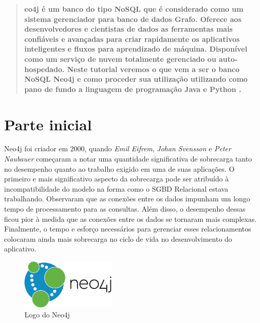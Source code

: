 \documentclass[a4paper,11pt]{article}
\begin{document}
	
\maketitle %
\thispagestyle{fancy} %

	
\begin{abstract}
	\textbf{eo4j é um banco do tipo NoSQL que é considerado como um sistema gerenciador para banco de dados Grafo. Oferece aos desenvolvedores e cientistas de dados as ferramentas mais confiáveis e avançadas para criar rapidamente os aplicativos inteligentes e fluxos para aprendizado de máquina. Disponível como um serviço de nuvem totalmente gerenciado ou auto-hospedado. Neste tutorial veremos o que vem a ser o banco NoSQL Neo4j \cite{neo4joficial} e como proceder sua utilização utilizando como pano de fundo a linguagem de programação Java \cite{javaoficial} e Python \cite{pythonoficial}.}
\end{abstract}


\section{Parte inicial}
Neo4j foi criador em 2000, quando \textit{Emil Eifrem}, \textit{Johan Svensson} e \textit{Peter Naubauer} começaram a notar uma quantidade significativa de sobrecarga tanto no desempenho quanto ao trabalho exigido em uma de suas aplicações. O primeiro e mais significativo aspecto da sobrecarga pode ser atribuído à incompatibilidade do modelo na forma como o SGBD Relacional estava trabalhando. Observaram que as conexões entre os dados impunham um longo tempo de processamento para as consultas. Além disso, o desempenho dessas ficou pior à medida que as conexões entre os dados se tornaram mais complexas. Finalmente, o tempo e esforço necessários para gerenciar esses relacionamentos colocaram ainda mais sobrecarga no ciclo de vida no desenvolvimento do aplicativo.
\begin{figure}[H]
	\centering
	\includegraphics[width=0.4\textwidth]{imagens/neo4jlogo}
	\caption{Logo do Neo4j}
\end{figure}
\end{document}
